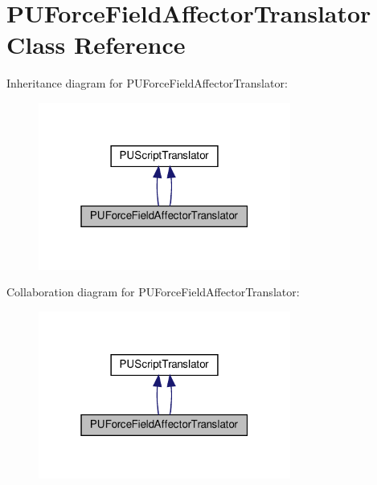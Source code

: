 \hypertarget{classPUForceFieldAffectorTranslator}{}\section{P\+U\+Force\+Field\+Affector\+Translator Class Reference}
\label{classPUForceFieldAffectorTranslator}


Inheritance diagram for P\+U\+Force\+Field\+Affector\+Translator\+:
\nopagebreak
\begin{figure}[H]
\begin{center}
\leavevmode
\includegraphics[width=235pt]{classPUForceFieldAffectorTranslator__inherit__graph}
\end{center}
\end{figure}


Collaboration diagram for P\+U\+Force\+Field\+Affector\+Translator\+:
\nopagebreak
\begin{figure}[H]
\begin{center}
\leavevmode
\includegraphics[width=235pt]{classPUForceFieldAffectorTranslator__coll__graph}
\end{center}
\end{figure}
